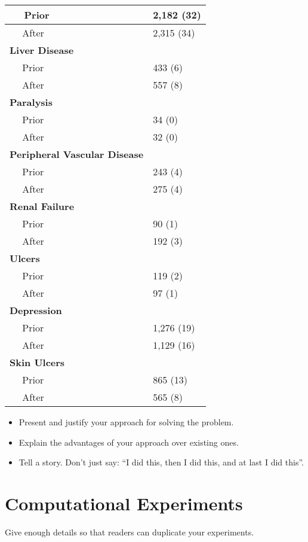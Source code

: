 \documentclass[10pt]{article}
\begin{document}
\begin{tabular}{l|l}
\hline
~~ Prior & 2,182 (32)\\
\hline
~~ After & 2,315 (34)\\
\hline
\bf{Liver Disease} & ~\\
\hline
~~ Prior & 433 (6)\\
\hline
~~ After & 557 (8)\\
\hline
\bf{Paralysis} & ~\\
\hline
~~ Prior & 34 (0)\\
\hline
~~ After & 32 (0)\\
\hline
\bf{Peripheral Vascular Disease} & ~\\
\hline
~~ Prior & 243 (4)\\
\hline
~~ After & 275 (4)\\
\hline
\bf{Renal Failure} & ~\\
\hline
~~ Prior & 90 (1)\\
\hline
~~ After & 192 (3)\\
\hline
\bf{Ulcers} & ~\\
\hline
~~ Prior & 119 (2)\\
\hline
~~ After & 97 (1)\\
\hline
\bf{Depression} & ~\\
\hline
~~ Prior & 1,276 (19)\\
\hline
~~ After & 1,129 (16)\\
\hline
\bf{Skin Ulcers} & ~\\
\hline
~~ Prior & 865 (13)\\
\hline
~~ After & 565 (8)\\
\hline
\end{tabular}

\begin{itemize}
\item Present and justify your approach for solving the problem. 
\item Explain the advantages of your approach over existing ones.

\item Tell a story.
Don't just say: ``I did this, then I did this, and at last I did this''.
\end{itemize}

\section{Computational Experiments}
Give enough details so that readers can duplicate your experiments.
\end{document}
